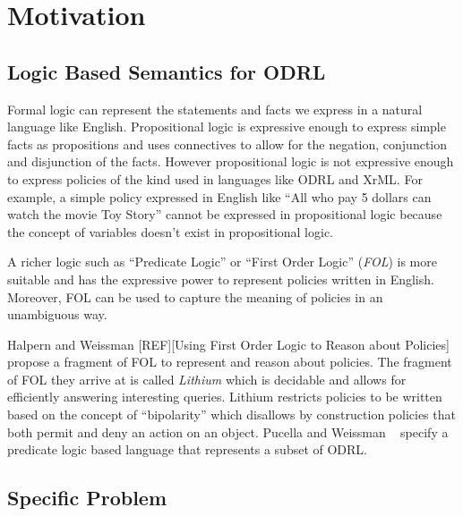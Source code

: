 \chapter{Motivation}

\section{Logic Based Semantics for ODRL}


Formal logic can represent the statements and facts we express in a natural language like English. Propositional logic is expressive enough to express simple facts as propositions and uses connectives to allow for the negation, conjunction and disjunction of the facts. However propositional logic is not expressive enough to express policies of the kind used in languages like ODRL and XrML. For example, a simple policy expressed in English like ``All who pay 5 dollars can watch the movie Toy Story'' cannot be expressed in propositional logic because the concept of  variables doesn't exist in propositional logic. 

A richer logic such as ``Predicate Logic'' or ``First Order Logic'' (\emph{FOL}) is more suitable and has the expressive power to represent policies written in English. Moreover, FOL can be used to capture the meaning of policies in an unambiguous way.

Halpern and Weissman [REF][Using First Order Logic to Reason about Policies] propose a fragment of FOL to represent and reason about policies. The fragment of FOL they arrive at is called \emph{Lithium} which is decidable and allows for efficiently answering interesting queries. Lithium restricts policies to be written based on the concept of ``bipolarity'' which disallows by construction policies that both permit and deny an action on an object. Pucella and Weissman ~\cite{pucella2006} specify a predicate logic based language that represents a subset of ODRL.


\section{Specific Problem}

